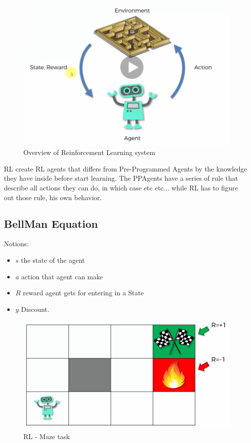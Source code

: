  \begin{figure}
    \centering
    \includegraphics[scale=0.65]{img/reinforcementlearning01.png}
    \caption{Overview of Reinforcement Learning system}
    \label{img:RL-System}
\end{figure}

RL create RL agents that differs from Pre-Programmed Agents by the knowledge they have inside before start learning. The PPAgents have a series of rule that describe all actions they can do, in which case etc etc... while RL has to figure out those rule, his own behavior.

\subsection{BellMan Equation}

Notions:
\begin{itemize}
 \item $s$ the state of the agent
 \item $a$ action that agent can make
 \item $R$ reward agent gets for entering in a State
 \item $y$ Discount. 
 \end{itemize} 
 
  \begin{figure}
    \centering
    \includegraphics[scale=0.35]{img/rl-maze.png}
    \caption{RL - Maze task}
    \label{img:RL-Maze}
\end{figure}

